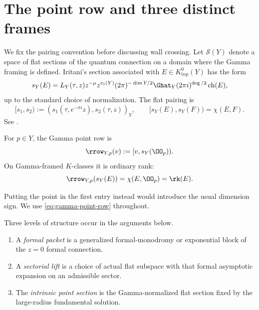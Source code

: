 \section{The point row and three distinct frames}\label{sec:point-row}

We fix the pairing convention before discussing wall crossing.  Let
\(\mathcal S(Y)\) denote a space of flat sections of the quantum connection on
a domain where the Gamma framing is defined.  Iritani's section associated
with \(E\in K^0_{\mathrm{top}}(Y)\) has the form
\begin{equation}\label{eq:gamma-framed-section}
 s_Y(E)=L_Y(\tau,z)z^{-\mu}z^{c_1(Y)}
 (2\pi)^{-\dim Y/2}\Ghat_Y(2\pi i)^{\deg/2}\operatorname{ch}(E),
\end{equation}
up to the standard choice of normalization.  The flat pairing is
\begin{equation}\label{eq:flat-euler-pairing}
 [s_1,s_2):=(s_1(\tau,e^{-\pi i}z),s_2(\tau,z))_Y,
 \qquad [s_Y(E),s_Y(F))=\chi(E,F).
\end{equation}
See \cite[Section~1]{IritaniGamma}.

\begin{definition}\label{def:point-row}
For \(p\in Y\), the Gamma point row is
\begin{equation}\label{eq:gamma-point-row}
 \rrow_{Y,p}(v):=[v,s_Y(\OO_p)).
\end{equation}
On Gamma-framed \(K\)-classes it is ordinary rank:
\begin{equation}\label{eq:point-row-rank}
 \rrow_{Y,p}(s_Y(E))=\chi(E,\OO_p)=\rk(E).
\end{equation}
\end{definition}

Putting the point in the first entry instead would introduce the usual
dimension sign.  We use \eqref{eq:gamma-point-row} throughout.

Three levels of structure occur in the arguments below.
\begin{enumerate}[label=\textup{(\roman*)}]
\item A \emph{formal packet} is a generalized formal-monodromy or
  exponential block of the \(z=0\) formal connection.
\item A \emph{sectorial lift} is a choice of actual flat subspace with that
  formal asymptotic expansion on an admissible sector.
\item The \emph{intrinsic point section} is the Gamma-normalized flat
  section fixed by the large-radius fundamental solution.
\end{enumerate}

